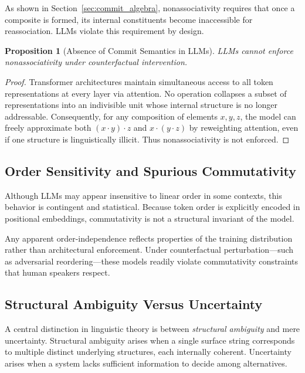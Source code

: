 \documentclass[11pt]{article}
\newtheorem{proposition}{Proposition}
\begin{document}
As shown in Section~\ref{sec:commit_algebra}, nonassociativity requires that once a composite is formed, its internal constituents become inaccessible for reassociation. LLMs violate this requirement by design.

\begin{proposition}[Absence of Commit Semantics in LLMs]
LLMs cannot enforce nonassociativity under counterfactual intervention.
\end{proposition}

\begin{proof}
Transformer architectures maintain simultaneous access to all token representations at every layer via attention. No operation collapses a subset of representations into an indivisible unit whose internal structure is no longer addressable. Consequently, for any composition of elements $x,y,z$, the model can freely approximate both $(x \cdot y) \cdot z$ and $x \cdot (y \cdot z)$ by reweighting attention, even if one structure is linguistically illicit. Thus nonassociativity is not enforced.
\end{proof}

\subsection{Order Sensitivity and Spurious Commutativity}

Although LLMs may appear insensitive to linear order in some contexts, this behavior is contingent and statistical. Because token order is explicitly encoded in positional embeddings, commutativity is not a structural invariant of the model.

Any apparent order-independence reflects properties of the training distribution rather than architectural enforcement. Under counterfactual perturbation—such as adversarial reordering—these models readily violate commutativity constraints that human speakers respect.

\subsection{Structural Ambiguity Versus Uncertainty}

A central distinction in linguistic theory is between \emph{structural ambiguity} and mere uncertainty. Structural ambiguity arises when a single surface string corresponds to multiple distinct underlying structures, each internally coherent. Uncertainty arises when a system lacks sufficient information to decide among alternatives.
\end{document}
